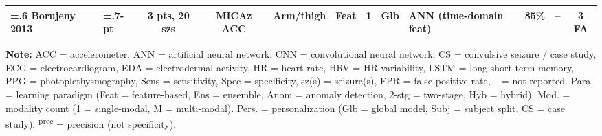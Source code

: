 \begin{landscape}
\begin{table}[htbp]
\begin{tabularx}{\linewidth}{@{} >{\hsize=.6\hsize}X >{\hsize=.7\hsize}X c c c c c c >{\hsize=1.1\hsize}X c c c @{}}
\addlinespace
\textbf{Borujeny 2013} & 3-pt & 3 pts, 20 szs & MICAz ACC & Arm/thigh & Feat & 1 & Glb & ANN (time-domain feat) & 85\% & -- & 3 FA \\
\bottomrule
\end{tabularx}
\par\medskip
\tiny
\textbf{Note:} ACC = accelerometer, ANN = artificial neural network, CNN = convolutional neural network, CS = convulsive seizure / case study, ECG = electrocardiogram, EDA = electrodermal activity, HR = heart rate, HRV = HR variability, LSTM = long short-term memory, PPG = photoplethysmography, Sens = sensitivity, Spec = specificity, sz(s) = seizure(s), FPR = false positive rate, -- = not reported. Para. = learning paradigm (Feat = feature-based, Ens = ensemble, Anom = anomaly detection, 2-stg = two-stage, Hyb = hybrid). Mod. = modality count (1 = single-modal, M = multi-modal). Pers. = personalization (Glb = global model, Subj = subject split, CS = case study). \textsuperscript{prec} = precision (not specificity).
\end{table}
\end{landscape}
